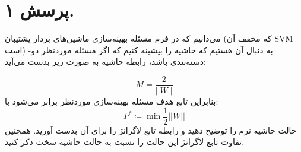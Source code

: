 \section{پرسش ۱.}
می‌دانیم که در فرم مسئله بهینه‌سازی ماشین‌های بردار پشتیبان (که مخفف آن SVM است) به دنبال آن هستیم که حاشیه را بیشینه کنیم که اگر مسئله موردنظر دو-دسته‌بندی باشد، رابطه حاشیه به صورت زیر بدست می‌آید:

\begin{equation}
	M = \frac{2}{||W||}
	\label{eq1}
\end{equation}
بنابراین تابع هدف مسئله بهینه‌سازی موردنظر برابر می‌شود با:
\begin{equation}
	P^{*} \coloneq \min \frac{1}{2} ||W||
	\label{eq2}
\end{equation}
حالت حاشیه نرم را توضیح دهید و رابطه تابع لاگرانژ را برای آن بدست آورید. همچنین تفاوت تابع لاگرانژ این حالت را نسبت به حالت حاشیه سخت ذکر کنید.